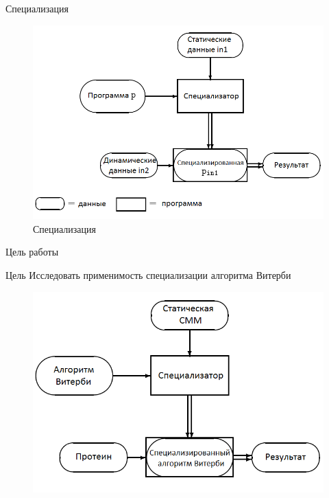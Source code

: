 \documentclass[hyperref={pdfpagelabels=false}]{beamer}
\begin{document}
\begin{frame}{Специализация}
\begin{figure}
	\includegraphics[scale=0.45]{spec.png}
	\caption{Специализация}
\end{figure}
\end{frame} 


\begin{frame}{Цель работы}
\begin{block}{Цель}
Исследовать применимость специализации алгоритма Витерби
\end{block}
\vfill
\begin{figure}
	\includegraphics[scale=0.40]{spec_Viterbi.png}
\end{figure}
\end{frame}


\end{document}

